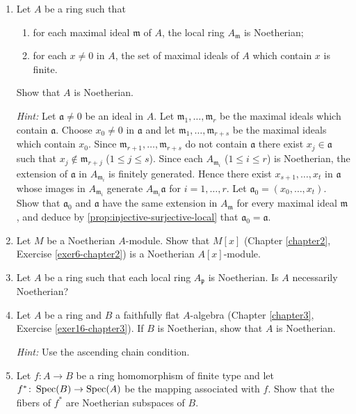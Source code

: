 \begin{enumerate}
    \item \label{exer9-chapter7}Let $A$ be a ring such that
    \begin{enumerate}
        \item[(1)] for each maximal ideal $\mathfrak{m}$ of $A$, the local ring $A_\mathfrak{m}$ is Noetherian;
        \item[(2)] for each $x \neq 0$ in $A$, the set of maximal ideals of $A$ which contain $x$ is finite.
    \end{enumerate}
    Show that $A$ is Noetherian.

    \textit{Hint:} Let $\mathfrak{a} \neq 0$ be an ideal in $A$. Let $\mathfrak{m}_1, \ldots, \mathfrak{m}_r$ be the maximal ideals which contain $\mathfrak{a}$. Choose $x_0 \neq 0$ in $\mathfrak{a}$ and let $\mathfrak{m}_1, \ldots, \mathfrak{m}_{r+s}$ be the maximal ideals which contain $x_0$. Since $\mathfrak{m}_{r+1}, \ldots, \mathfrak{m}_{r+s}$ do not contain $\mathfrak{a}$ there exist $x_j \in \mathfrak{a}$ such that $x_j \notin \mathfrak{m}_{r+j}$ ($1 \leq j \leq s$). Since each $A_{\mathfrak{m}_i}$ ($1 \leq i \leq r$) is Noetherian, the extension of $\mathfrak{a}$ in $A_{\mathfrak{m}_i}$ is finitely generated. Hence there exist $x_{s+1}, \ldots, x_t$ in $\mathfrak{a}$ whose images in $A_{\mathfrak{m}_i}$ generate $A_{\mathfrak{m}_i}\mathfrak{a}$ for $i = 1, \ldots, r$. Let $\mathfrak{a}_0 = (x_0, \ldots, x_t)$. Show that $\mathfrak{a}_0$ and $\mathfrak{a}$ have the same extension in $A_\mathfrak{m}$ for every maximal ideal $\mathfrak{m}$, and deduce by \eqref{prop:injective-surjective-local} that $\mathfrak{a}_0 = \mathfrak{a}$.

    \item \label{exer10-chapter7}Let $M$ be a Noetherian $A$-module. Show that $M[x]$ (Chapter \ref{chapter2}, Exercise \ref{exer6-chapter2}) is a Noetherian $A[x]$-module.

    \item \label{exer11-chapter7}Let $A$ be a ring such that each local ring $A_\mathfrak{p}$ is Noetherian. Is $A$ necessarily Noetherian?

    \item \label{exer12-chapter7}Let $A$ be a ring and $B$ a faithfully flat $A$-algebra (Chapter \ref{chapter3}, Exercise \ref{exer16-chapter3}). If $B$ is Noetherian, show that $A$ is Noetherian.
    
    \textit{Hint:} Use the ascending chain condition.

    \item \label{exer13-chapter7}Let $f \colon A \to B$ be a ring homomorphism of finite type and let $f^* \colon \operatorname{Spec}(B) \to \operatorname{Spec}(A)$ be the mapping associated with $f$. Show that the fibers of $f^*$ are Noetherian subspaces of $B$.


\end{enumerate}
